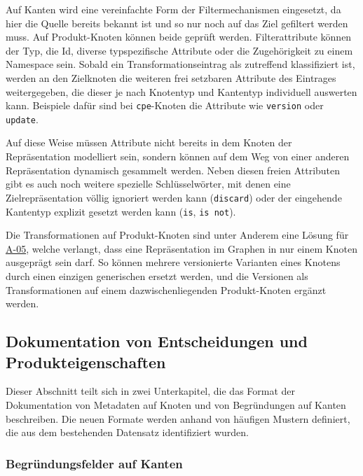 Auf Kanten wird eine vereinfachte Form der Filtermechanismen eingesetzt, da hier die Quelle bereits bekannt ist und so nur noch auf das Ziel gefiltert werden muss.
Auf Produkt-Knoten können beide geprüft werden.
Filterattribute können der Typ, die Id, diverse typspezifische Attribute oder die Zugehörigkeit zu einem Namespace sein.
Sobald ein Transformationseintrag als zutreffend klassifiziert ist, werden an den Zielknoten die weiteren frei setzbaren Attribute des Eintrages weitergegeben, die dieser je nach Knotentyp und Kantentyp individuell auswerten kann.
Beispiele dafür sind bei \texttt{cpe}-Knoten die Attribute wie \texttt{version} oder \texttt{update}.

Auf diese Weise müssen Attribute nicht bereits in dem Knoten der Repräsentation modelliert sein, sondern können auf dem Weg von einer anderen Repräsentation dynamisch gesammelt werden.
Neben diesen freien Attributen gibt es auch noch weitere spezielle Schlüsselwörter, mit denen eine Zielrepräsentation völlig ignoriert werden kann (\texttt{discard}) oder der eingehende Kantentyp explizit gesetzt werden kann (\texttt{is}, \texttt{is not}).

Die Transformationen auf Produkt-Knoten sind unter Anderem eine Lösung für \hyperref[subsec:req-unique-product-representations]{A-05}, welche verlangt, dass eine Repräsentation im Graphen in nur einem Knoten ausgeprägt sein darf.
So können mehrere versionierte Varianten eines Knotens durch einen einzigen generischen ersetzt werden, und die Versionen als Transformationen auf einem dazwischenliegenden Produkt-Knoten ergänzt werden.

\subsection{Dokumentation von Entscheidungen und Produkteigenschaften}\label{subsec:model-rationale}

Dieser Abschnitt teilt sich in zwei Unterkapitel, die das Format der Dokumentation von Metadaten auf Knoten und von Begründungen auf Kanten beschreiben.
Die neuen Formate werden anhand von häufigen Mustern definiert, die aus dem bestehenden Datensatz identifiziert wurden.

\subsubsection{Begründungsfelder auf Kanten}

